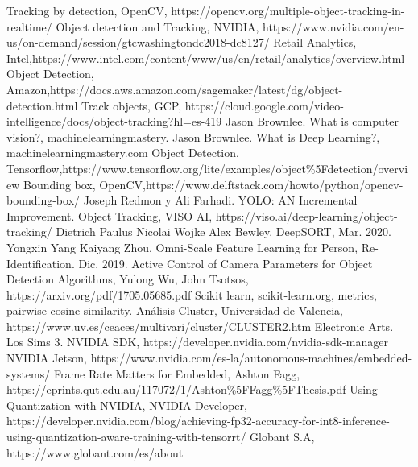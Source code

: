 \documentclass[a4paper]{IEEEtran}
\begin{document}
\begin{thebibliography}{00}
 Tracking by detection, OpenCV, https://opencv.org/multiple-object-tracking-in-realtime/
 Object detection and Tracking, NVIDIA, https://www.nvidia.com/en-us/on-demand/session/gtcwashingtondc2018-dc8127/
 Retail Analytics, Intel,\newline https://www.intel.com/content/www/us/en/retail/analytics/overview.html
 Object Detection, Amazon,\newline https://docs.aws.amazon.com/sagemaker/latest/dg/object-detection.html
 Track objects, GCP, https://cloud.google.com/video-intelligence/docs/object-tracking?hl=es-419
 Jason Brownlee. What is computer vision?, machinelearningmastery.
 Jason Brownlee. What is Deep Learning?, machinelearningmastery.com
 Object Detection, Tensorflow,\newline https://www.tensorflow.org/lite/examples/object\%5Fdetection/overview
 Bounding box, OpenCV,https://www.delftstack.com/howto/python/opencv-bounding-box/
 Joseph Redmon y Ali Farhadi. YOLO: AN Incremental Improvement.
 Object Tracking, VISO AI, https://viso.ai/deep-learning/object-tracking/
 Dietrich Paulus Nicolai Wojke Alex Bewley. DeepSORT, Mar. 2020.
 Yongxin Yang Kaiyang Zhou. Omni-Scale Feature Learning for Person, Re-Identification. Dic. 2019.
 Active Control of Camera Parameters for Object Detection Algorithms, Yulong Wu, John Tsotsos, https://arxiv.org/pdf/1705.05685.pdf
 Scikit learn, scikit-learn.org, metrics, pairwise cosine similarity.
 Análisis Cluster, Universidad de Valencia, https://www.uv.es/ceaces/multivari/cluster/CLUSTER2.htm
 Electronic Arts. Los Sims 3.
 NVIDIA SDK, https://developer.nvidia.com/nvidia-sdk-manager
 NVIDIA Jetson, https://www.nvidia.com/es-la/autonomous-machines/embedded-systems/
 Frame Rate Matters for Embedded, Ashton Fagg, https://eprints.qut.edu.au/117072/1/Ashton\%5FFagg\%5FThesis.pdf
 Using Quantization with NVIDIA, NVIDIA Developer, https://developer.nvidia.com/blog/achieving-fp32-accuracy-for-int8-inference-using-quantization-aware-training-with-tensorrt/
 Globant S.A, https://www.globant.com/es/about
\end{thebibliography}
\end{document}

